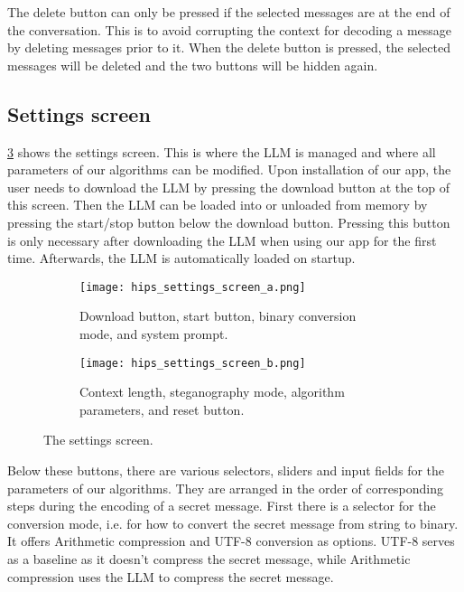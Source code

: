 The delete button can only be pressed if the selected messages are at the end of the conversation. This is to avoid corrupting the context for decoding a message by deleting messages prior to it. When the delete button is pressed, the selected messages will be deleted and the two buttons will be hidden again.

\subsection{Settings screen}
\label{sec:settingsScreen}
\cref{fig:settingsScreen} shows the settings screen. This is where the \gls{LLM} is managed and where all parameters of our algorithms can be modified. Upon installation of our app, the user needs to download the \gls{LLM} by pressing the download button at the top of this screen. Then the \gls{LLM} can be loaded into or unloaded from memory by pressing the start/stop button below the download button. Pressing this button is only necessary after downloading the \gls{LLM} when using our app for the first time. Afterwards, the \gls{LLM} is automatically loaded on startup.

\begin{figure}
    \captionsetup{width=\linewidth}
    \centering
    \begin{subfigure}{0.3\linewidth}
        \texttt{[image: hips\_settings\_screen\_a.png]}
        \caption{Download button, start button, binary conversion mode, and system prompt.}
        \label{fig:settingsScreenA}
    \end{subfigure}
    \hspace{1cm}
    \begin{subfigure}{0.3\linewidth}
        \texttt{[image: hips\_settings\_screen\_b.png]}
        \caption{Context length, steganography mode, algorithm parameters, and reset button.}
        \label{fig:settingsScreenB}
    \end{subfigure}
    \caption[HiPS: Settings screen]{The settings screen.}
    \label{fig:settingsScreen}
\end{figure}

Below these buttons, there are various selectors, sliders and input fields for the parameters of our algorithms. They are arranged in the order of corresponding steps during the encoding of a secret message. First there is a selector for the conversion mode, i.e. for how to convert the secret message from string to binary. It offers Arithmetic compression and UTF-8 conversion as options. UTF-8 serves as a baseline as it doesn't compress the secret message, while Arithmetic compression uses the \gls{LLM} to compress the secret message.

